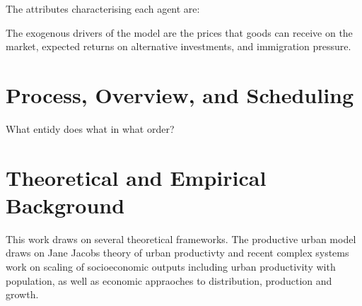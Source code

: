 The attributes %
 characterising each agent are:
%
%
%
%
%

The exogenous drivers of the model are the prices that goods can receive on the market, expected returns on alternative investments, %
and immigration pressure. %


\section*{Process, Overview, and Scheduling}

What entidy does what in what order? %



\section*{Theoretical and Empirical Background}

This work draws on several theoretical frameworks. 
The productive urban model draws on Jane Jacobs theory of urban productivty and recent complex systems work on scaling of socioeconomic outputs including urban productivity with population, as well as economic appraoches to distribution, production and growth. %

